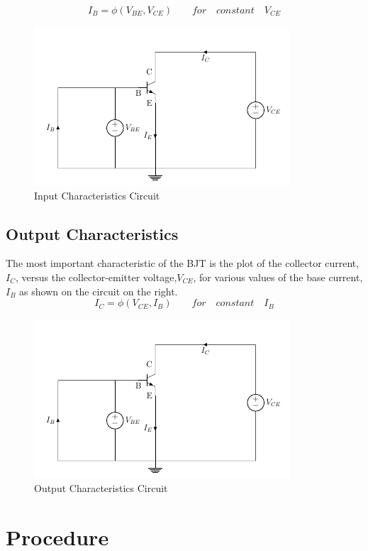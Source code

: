 			$$I_B=\phi (V_{BE},V_{CE}) \qquad for\quad constant \quad V_{CE}$$
			\begin{figure}[h]
				\centering
				\includegraphics[width=0.7\linewidth]{img/exp9/4}
				\caption{Input Characteristics Circuit}
				\label{fig:bjt_inputCircuit}
			\end{figure}
		
		\subsection{Output Characteristics}
			The most important characteristic of the BJT is the plot of the collector current, $I_C$, versus the collector-emitter voltage,$V_{CE}$, for various values of the base current, $I_B$ as shown on the circuit on the right.						
			$$I_C =\phi(V_{CE} , I_B) \qquad for\quad constant \quad I_B $$
			\begin{figure}[h]
				\centering
				\includegraphics[width=0.7\linewidth]{img/exp9/5}
				\caption{Output Characteristics Circuit}
				\label{fig:bjt_outputCircuit}
			\end{figure}
		
	\section{Procedure}
